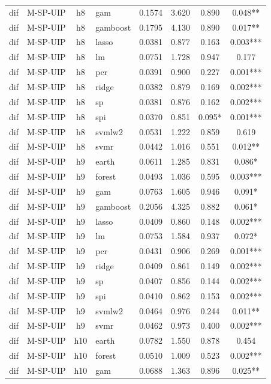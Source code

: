 \begin{ThreePartTable}
\begin{longtable}[t]{llclcccc}
dif & M-SP-UIP & h8 & gam & 0.1574 & 3.620 & 0.890 & 0.048**\\
dif & M-SP-UIP & h8 & gamboost & 0.1795 & 4.130 & 0.890 & 0.017**\\
dif & M-SP-UIP & h8 & lasso & 0.0381 & 0.877 & 0.163 & 0.003***\\
dif & M-SP-UIP & h8 & lm & 0.0751 & 1.728 & 0.947 & 0.177\\
dif & M-SP-UIP & h8 & pcr & 0.0391 & 0.900 & 0.227 & 0.001***\\
dif & M-SP-UIP & h8 & ridge & 0.0382 & 0.879 & 0.169 & 0.002***\\
dif & M-SP-UIP & h8 & sp & 0.0381 & 0.876 & 0.162 & 0.002***\\
dif & M-SP-UIP & h8 & spi & 0.0370 & 0.851 & 0.095* & 0.001***\\
dif & M-SP-UIP & h8 & svmlw2 & 0.0531 & 1.222 & 0.859 & 0.619\\
dif & M-SP-UIP & h8 & svmr & 0.0442 & 1.016 & 0.551 & 0.012**\\
\addlinespace
dif & M-SP-UIP & h9 & earth & 0.0611 & 1.285 & 0.831 & 0.086*\\
dif & M-SP-UIP & h9 & forest & 0.0493 & 1.036 & 0.595 & 0.003***\\
dif & M-SP-UIP & h9 & gam & 0.0763 & 1.605 & 0.946 & 0.091*\\
dif & M-SP-UIP & h9 & gamboost & 0.2056 & 4.325 & 0.882 & 0.061*\\
dif & M-SP-UIP & h9 & lasso & 0.0409 & 0.860 & 0.148 & 0.002***\\
dif & M-SP-UIP & h9 & lm & 0.0753 & 1.584 & 0.937 & 0.072*\\
dif & M-SP-UIP & h9 & pcr & 0.0431 & 0.906 & 0.269 & 0.001***\\
dif & M-SP-UIP & h9 & ridge & 0.0409 & 0.861 & 0.149 & 0.002***\\
dif & M-SP-UIP & h9 & sp & 0.0407 & 0.856 & 0.144 & 0.002***\\
dif & M-SP-UIP & h9 & spi & 0.0410 & 0.862 & 0.153 & 0.002***\\
dif & M-SP-UIP & h9 & svmlw2 & 0.0464 & 0.976 & 0.244 & 0.011**\\
dif & M-SP-UIP & h9 & svmr & 0.0462 & 0.973 & 0.400 & 0.002***\\
\addlinespace
dif & M-SP-UIP & h10 & earth & 0.0782 & 1.550 & 0.878 & 0.454\\
dif & M-SP-UIP & h10 & forest & 0.0510 & 1.009 & 0.523 & 0.002***\\
dif & M-SP-UIP & h10 & gam & 0.0688 & 1.363 & 0.896 & 0.025**\\

\end{longtable}
\end{ThreePartTable}
